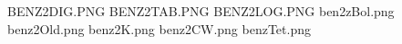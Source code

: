 BENZ2DIG.PNG
BENZ2TAB.PNG
BENZ2LOG.PNG
ben2zBol.png
benz2Old.png
benz2K.png
benz2CW.png
benzTet.png
